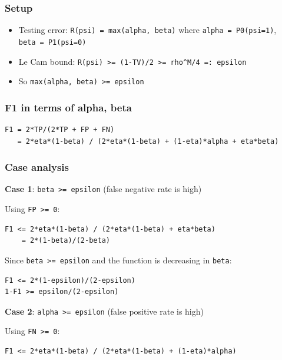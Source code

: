 \documentclass[
  12pt,
]{ctexart}
\providecommand{\tightlist}{%
  \setlength{\itemsep}{0pt}\setlength{\parskip}{0pt}}
\begin{document}
\subsubsection{Setup}\label{setup}

\begin{itemize}
\tightlist
\item
  Testing error: \texttt{R(psi)\ =\ max(alpha,\ beta)} where
  \texttt{alpha\ =\ P0(psi=1)}, \texttt{beta\ =\ P1(psi=0)}
\item
  Le Cam bound:
  \texttt{R(psi)\ \textgreater{}=\ (1-TV)/2\ \textgreater{}=\ rho\^{}M/4\ =:\ epsilon}
\item
  So \texttt{max(alpha,\ beta)\ \textgreater{}=\ epsilon}
\end{itemize}

\subsubsection{F1 in terms of alpha,
beta}\label{f1-in-terms-of-alpha-beta}

\begin{verbatim}
F1 = 2*TP/(2*TP + FP + FN)
   = 2*eta*(1-beta) / (2*eta*(1-beta) + (1-eta)*alpha + eta*beta)
\end{verbatim}

\subsubsection{Case analysis}\label{case-analysis}

\textbf{Case 1}: \texttt{beta\ \textgreater{}=\ epsilon} (false negative
rate is high)

Using \texttt{FP\ \textgreater{}=\ 0}:

\begin{verbatim}
F1 <= 2*eta*(1-beta) / (2*eta*(1-beta) + eta*beta)
    = 2*(1-beta)/(2-beta)
\end{verbatim}

Since \texttt{beta\ \textgreater{}=\ epsilon} and the function is
decreasing in \texttt{beta}:

\begin{verbatim}
F1 <= 2*(1-epsilon)/(2-epsilon)
1-F1 >= epsilon/(2-epsilon)
\end{verbatim}

\textbf{Case 2}: \texttt{alpha\ \textgreater{}=\ epsilon} (false
positive rate is high)

Using \texttt{FN\ \textgreater{}=\ 0}:

\begin{verbatim}
F1 <= 2*eta*(1-beta) / (2*eta*(1-beta) + (1-eta)*alpha)
\end{verbatim}
\end{document}
